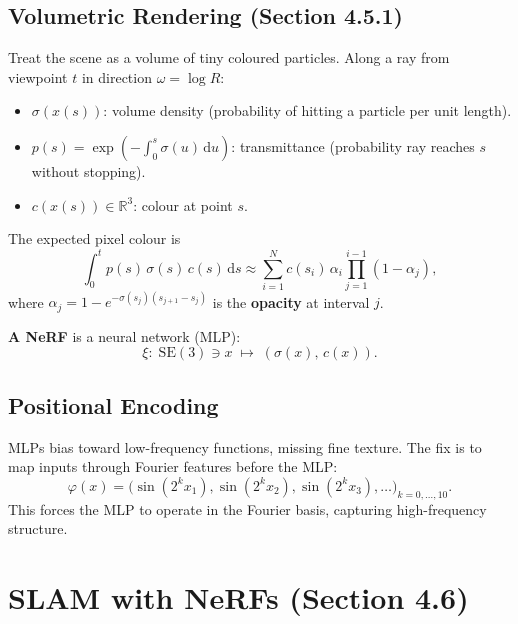 \documentclass[12pt, a4paper]{article}
\begin{document}
\subsection{Volumetric Rendering (Section 4.5.1)}

Treat the scene as a volume of tiny coloured particles. Along a ray
from viewpoint $t$ in direction $\omega=\log R$:
\begin{itemize}
  \item $\sigma(x(s))$: volume density (probability of hitting a
    particle per unit length).
  \item $p(s)=\exp\!\left(-\int_0^s\sigma(u)\,\mathrm{d}u\right)$:
    transmittance (probability ray reaches $s$ without stopping).
  \item $c(x(s))\in\mathbb{R}^3$: colour at point $s$.
\end{itemize}

The expected pixel colour is
\begin{equation}
  \int_0^t p(s)\,\sigma(s)\,c(s)\,\mathrm{d}s
  \approx \sum_{i=1}^{N} c(s_i)\,\alpha_i\prod_{j=1}^{i-1}(1-\alpha_j),
  \label{eq:volume_render}
\end{equation}
where $\alpha_j = 1-e^{-\sigma(s_j)(s_{j+1}-s_j)}$ is the
\textbf{opacity} at interval $j$.

\textbf{A NeRF} is a neural network (MLP):
\begin{equation}
  \xi:\; \mathrm{SE}(3)\ni x \;\mapsto\; (\sigma(x),\, c(x)).
\end{equation}

\subsection{Positional Encoding}

MLPs bias toward low-frequency functions, missing fine texture. The fix
is to map inputs through Fourier features before the MLP:
\begin{equation}
  \varphi(x) = \bigl(\sin(2^k x_1),\sin(2^k x_2),\sin(2^k x_3),\ldots\bigr)_{k=0,\ldots,10}.
\end{equation}
This forces the MLP to operate in the Fourier basis, capturing
high-frequency structure.

\section{SLAM with NeRFs (Section 4.6)}
\end{document}
